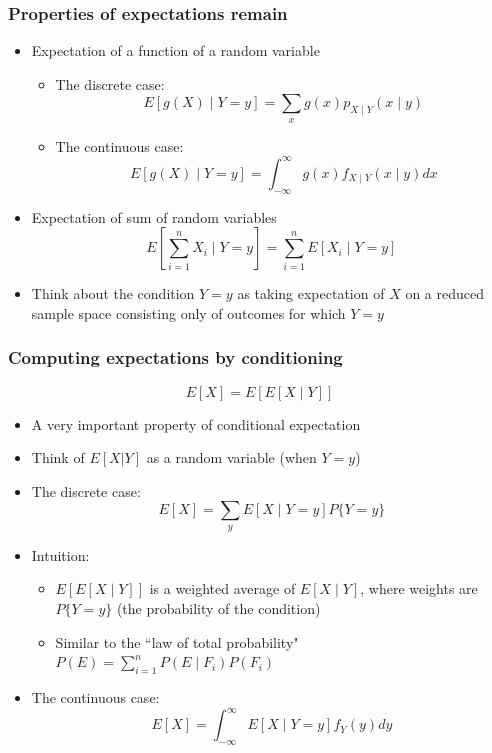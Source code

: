 \documentclass[slidestop,compress,mathserif]{beamer}
\begin{document}
\begin{frame}\frametitle{Properties of expectations remain}
\begin{itemize}
\item Expectation of a function of a random variable
\begin{itemize}
\item The discrete case:
$$E[g(X) \mid Y = y] = \sum_x g(x)p_{X \mid Y}(x \mid y)$$
\item The continuous case:
$$E[g(X) \mid Y = y] = \int_{-\infty}^{\infty}g(x)f_{X \mid Y}(x \mid y)dx$$
\end{itemize}
\pause
\vspace{2mm}
\item Expectation of sum of random variables
$$E[\sum_{i=1}^n X_i \mid Y = y] = \sum_{i=1}^n E[X_i \mid Y = y]$$
\vspace{2mm}
\pause
\item Think about the condition $Y = y$ as taking expectation of $X$ on a reduced sample space consisting only of outcomes for which $Y = y$
\end{itemize}
\end{frame}

\begin{frame}\frametitle{Computing expectations by conditioning}
$$E[X] = E[E[X\mid Y]]$$
\begin{itemize}
\item A very important property of conditional expectation
\item Think of $E[X|Y]$ as a random variable (when $Y = y$)
\item The discrete case:
$$E[X] = \sum_y E[X\mid Y = y]P\{Y = y\}$$
\item Intuition:
\begin{itemize}
\item $E[E[X\mid Y]]$ is a weighted average of $E[X\mid Y]$, where weights are $P\{Y = y\}$ (the probability of the condition)
\item Similar to the ``law of total probability" $P(E) = \sum_{i=1}^n P(E\mid F_i)P(F_i)$
\end{itemize}
\vspace{2mm}
\pause
\item The continuous case:
$$E[X] = \int_{-\infty}^{\infty}E[X\mid Y = y]f_Y(y)dy$$
\end{itemize}
\end{frame}
\end{document}
